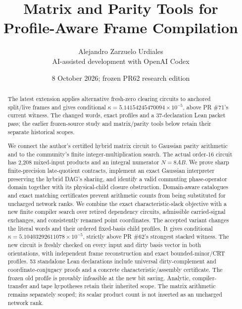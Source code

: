 \documentclass[11pt]{article}
\title{Matrix and Parity Tools for\\Profile-Aware Frame Compilation}
\author{Alejandro Zarzuelo Urdiales\\\small AI-assisted development with OpenAI Codex}
\date{8 October 2026; frozen PR62 research edition}
\begin{document}
\maketitle
\begin{abstract}
The latest extension applies alternative fresh-zero clearing circuits to
anchored split/live frames and gives conditional
$\kappa=5.14154245470094\times10^{-5}$, above PR \#71's current witness.
The changed words, exact profiles and a 37-declaration Lean packet pass;
the earlier frozen-source study and matrix/parity tools below retain their
separate historical scopes.

We connect the author's certified hybrid matrix circuit to Gaussian parity
arithmetic and to the community's finite integer-multiplication search.
The actual order-16 circuit has 2,208 mixed-input products and an integral
numerator $N=8AB$. We prove sharp finite-precision late-quotient contracts,
implement an exact Gaussian interpreter preserving the hybrid DAG's sharing,
and identify a valid commuting phase-operator domain together with its
physical-child closure obstruction. Domain-aware catalogues and exact
matching certificates prevent arithmetic counts from being substituted for
uncharged network ranks. We combine the exact characteristic-slack objective with a new finite compiler
search over retired dependency circuits, admissible carried-signal exchanges,
and consistently renamed point coordinates. The accepted variant changes the
literal words and their ordered fixed-basis child profiles. It gives conditional
$\kappa=5.10403292611078\times10^{-5}$, strictly above PR \#62's strongest stacked
witness. The new circuit is freshly checked on every input and dirty basis
vector in both orientations, with independent frame reconstruction and exact
bounded-minor/CRT profiles. 53 standalone Lean declarations include
universal dirty-complement and coordinate-conjugacy proofs and a concrete
characteristic/assembly certificate. The frozen old profile is provably
infeasible at the new bit saving. Analytic, compiler-transfer and tape hypotheses
retain their inherited scope. The matrix arithmetic remains separately scoped;
its scalar product count is not inserted as an uncharged network rank.
\end{abstract}
\end{document}
